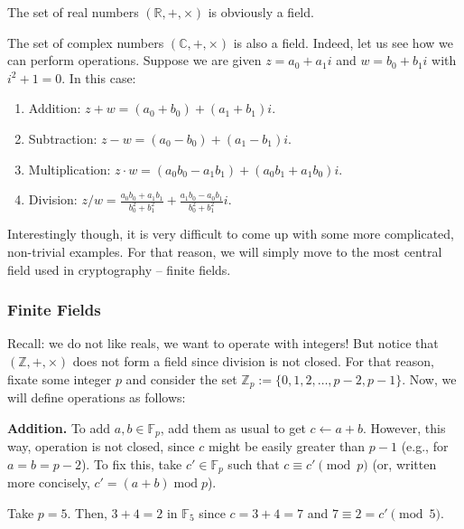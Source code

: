 \documentclass[../lecture-notes.tex]{subfiles}
\begin{document}
\begin{example}
    The set of real numbers $(\mathbb{R}, +, \times)$ is obviously a field.
\end{example}

\begin{example}
    The set of complex numbers $(\mathbb{C}, +, \times)$ is also a field. Indeed, let us see how we can perform operations. Suppose we are given $z = a_0 + a_1i$ and $w = b_0 + b_1i$ with $i^2+1=0$. In this case:
    \begin{enumerate}
        \item Addition: $z + w = (a_0 + b_0) + (a_1 + b_1)i$.
        \item Subtraction: $z - w = (a_0 - b_0) + (a_1 - b_1)i$.
        \item Multiplication: $z \cdot w = (a_0b_0 - a_1b_1) + (a_0b_1 + a_1b_0)i$.
        \item Division: $z / w = \frac{a_0b_0 + a_1b_1}{b_0^2 + b_1^2} + \frac{a_1b_0 - a_0b_1}{b_0^2 + b_1^2}i$.
    \end{enumerate}
\end{example}

Interestingly though, it is very difficult to come up with some more complicated, non-trivial examples. For that reason, we will simply move to the most central field used in cryptography -- finite fields.

\subsubsection{Finite Fields}
Recall: we do not like reals, we want to operate with integers! But notice that $(\mathbb{Z},+,\times)$ does not form a field since division is not closed. For that reason, fixate some integer $p$ and consider the set $\mathbb{Z}_p := \{0,1,2,\dots,p-2,p-1\}$. Now, we will define operations as follows:

\textbf{Addition.} To add $a,b \in \mathbb{F}_p$, add them as usual to get $c \gets a+b$. However, this way, operation is not closed, since $c$ might be easily greater than $p-1$ (e.g., for $a=b=p-2$). To fix this, take $c' \in \mathbb{F}_p$ such that $c \equiv c' \pmod{p}$ (or, written more concisely, $c' = (a+b) \;\text{mod} \; p$). 

\begin{example}
    Take $p=5$. Then, $3+4 = 2$ in $\mathbb{F}_5$ since $c=3+4=7$ and $7 \equiv 2 = c' \pmod{5}$.
\end{example}
\end{document}
